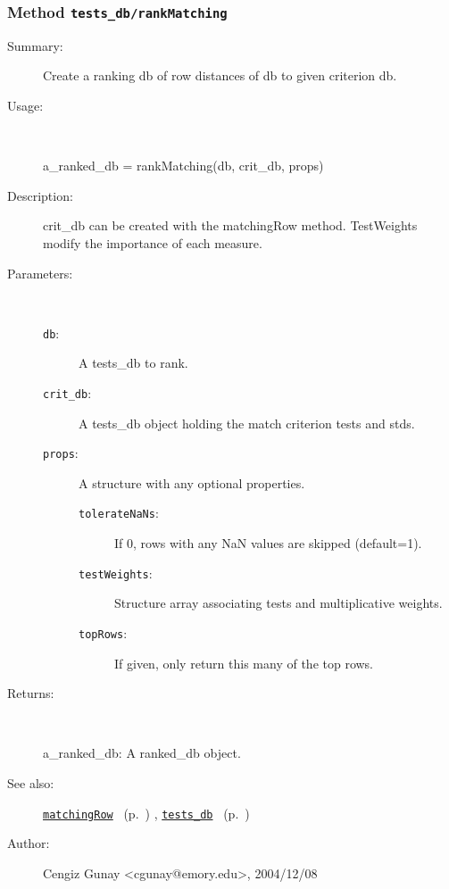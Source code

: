 \subsubsection[Method \texttt{rankMatching}]{Method \texttt{tests\_db/rankMatching}}%
%
\label{ref_tests_db__rankMatching}%
\hypertarget{ref_tests_db__rankMatching}{}%
\begin{description}
\item[Summary:]Create a ranking db of row distances of db to given criterion db.
%
\item[Usage:]~%
\begin{lyxcode}%
a\_ranked\_db = rankMatching(db, crit\_db, props)
%
\end{lyxcode}%
%
\item[Description:]%
crit\_db can be created with the matchingRow method. TestWeights modify the importance 
 of each measure.
\item[Parameters:]~
\begin{description}%
\item[\texttt{db}:]
 A tests\_db to rank.
\item[\texttt{crit\_db}:]
 A tests\_db object holding the match criterion tests and stds.
\item[\texttt{props}:]
 A structure with any optional properties.
\begin{description}%
\item[\texttt{tolerateNaNs}:]
 If 0, rows with any NaN values are skipped (default=1).
\item[\texttt{testWeights}:]
 Structure array associating tests and multiplicative weights.
\item[\texttt{topRows}:]
 If given, only return this many of the top rows.
\end{description}%
\end{description}%
%
\item[Returns:]~

	a\_ranked\_db: A ranked\_db object.
%
%
\item[See also:]%
\hyperlink{ref_matchingRow}{\texttt{matchingRow}}%
\ (p.~\pageref{ref_matchingRow})%
%
, \hyperlink{ref_tests_db}{\texttt{tests\_db}}%
\ (p.~\pageref{ref_tests_db})%
%
%
\item[Author:]%
Cengiz Gunay <cgunay@emory.edu>, 2004/12/08%
\end{description}
\methodline%
